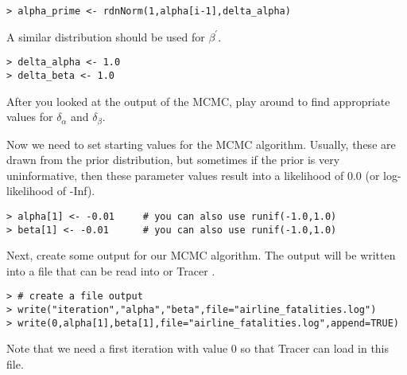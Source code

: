 {\tt \begin{snugshade*}
\begin{lstlisting}    
> alpha_prime <- rdnNorm(1,alpha[i-1],delta_alpha)
\end{lstlisting}
\end{snugshade*}}
A similar distribution should be used for $\beta^{\prime}$. 
{\tt \begin{snugshade*}
\begin{lstlisting}    
> delta_alpha <- 1.0
> delta_beta <- 1.0
\end{lstlisting}
\end{snugshade*}}
After you looked at the output of the MCMC, play around to find appropriate values for $\delta_{\alpha}$ and $\delta_{\beta}$.

Now we need to set starting values for the MCMC algorithm.
Usually, these are drawn from the prior distribution, but sometimes if the prior is very uninformative, then these parameter values result into a likelihood of 0.0 (or log-likelihood of -Inf).
{\tt \begin{snugshade*}
\begin{lstlisting}    
> alpha[1] <- -0.01     # you can also use runif(-1.0,1.0)
> beta[1] <- -0.01      # you can also use runif(-1.0,1.0)
\end{lstlisting}
\end{snugshade*}}
Next, create some output for our MCMC algorithm.
The output will be written into a file that can be read into \R or Tracer \citep{rambaut09}.
{\tt \begin{snugshade*}
\begin{lstlisting}    
> # create a file output
> write("iteration","alpha","beta",file="airline_fatalities.log")
> write(0,alpha[1],beta[1],file="airline_fatalities.log",append=TRUE)
\end{lstlisting}
\end{snugshade*}}
Note that we need a first iteration with value 0 so that Tracer can load in this file.

